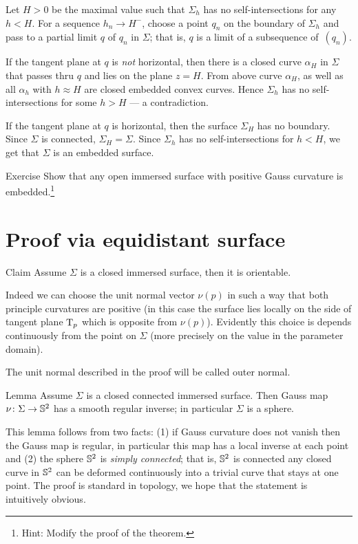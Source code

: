 Let $H>0$ be the maximal value such that $\Sigma_h$ has no self-intersections for any $h<H$.
For a sequence $h_n\to H^-$, choose a point $q_n$ on the boundary of $\Sigma_h$ and pass to a partial limit $q$ of $q_n$ in $\Sigma$;
that is, $q$ is a limit of a subsequence of~$(q_n)$.

If the tangent plane at $q$ is \emph{not} horizontal, 
then there is a closed curve $\alpha_H$ in $\Sigma$ that passes thru $q$ and lies on the plane $z=H$.
From above curve $\alpha_H$, as well as all $\alpha_h$ with $h\approx H$ are closed embedded convex curves.
Hence $\Sigma_h$ has no self-intersections for some $h>H$ --- a contradiction.

If the tangent plane at $q$ is horizontal,
then the surface $\Sigma_H$ has no boundary.
Since $\Sigma$ is connected, $\Sigma_H=\Sigma$.
Since $\Sigma_h$ has no self-intersections for $h<H$, we get that $\Sigma$ is an embedded surface.
\qeds

\begin{thm}{Exercise}
Show that any open immersed surface with positive Gauss curvature is embedded.\footnote{Hint: Modify the proof of the theorem.}
\end{thm}

\section{Proof via equidistant surface}

\begin{thm}{Claim}
Assume $\Sigma$ is a closed immersed surface, then it is orientable.
\end{thm}


 Indeed we can choose the unit normal vector $\nu(p)$ in such a way that both principle curvatures are positive (in this case the surface lies locally on the side of tangent plane $\mathrm{T}_p$ which is opposite from $\nu(p)$).
Evidently this choice is depends continuously from the point on $\Sigma$ (more precisely on the value in the parameter domain).
\qeds

The unit normal described in the proof will be called outer normal.

\begin{thm}{Lemma}\label{lem:gauss-inverse}
Assume $\Sigma$ is a closed connected immersed surface.
Then Gauss map $\nu\colon\Sigma \to \mathbb{S}^2$ has a smooth regular inverse;
in particular $\Sigma$ is a sphere.
\end{thm}

This lemma follows from two facts:
(1) if Gauss curvature does not vanish then the  Gauss map is regular, in particular this map has a local inverse at each point
and
(2) the sphere $\mathbb{S}^2$ is \emph{simply connected};
that is, $\mathbb{S}^2$ is connected any closed curve in $\mathbb{S}^2$ can be deformed continuously into a trivial curve that stays at one point.
The proof is standard in topology, we hope that the statement is intuitively obvious.

